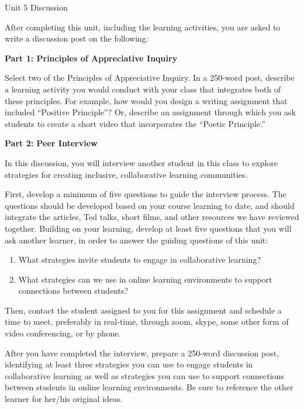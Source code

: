\documentclass[
]{book}
\providecommand{\tightlist}{%
  \setlength{\itemsep}{0pt}\setlength{\parskip}{0pt}}
\begin{document}
\begin{assessment}
{Unit 5 Discussion}

After completing this unit, including the learning activities, you are asked to write a discussion post on the following:

\textbf{Part 1: Principles of Appreciative Inquiry}

Select two of the Principles of Appreciative Inquiry. In a 250-word post, describe a learning activity you would conduct with your class that integrates both of these principles. For example, how would you design a writing assignment that included ``Positive Principle''? Or, describe an assignment through which you ask students to create a short video that incorporates the ``Poetic Principle.''

\textbf{Part 2: Peer Interview}

In this discussion, you will interview another student in this class to explore strategies for creating inclusive, collaborative learning communities.

First, develop a minimum of five questions to guide the interview process. The questions should be developed based on your course learning to date, and should integrate the articles, Ted talks, short films, and other resources we have reviewed together. Building on your learning, develop at least five questions that you will ask another learner, in order to answer the guiding questions of this unit:

\begin{enumerate}
\def\labelenumi{\arabic{enumi}.}
\tightlist
\item
  What strategies invite students to engage in collaborative learning?\\
\item
  What strategies can we use in online learning environments to support connections between students?
\end{enumerate}

Then, contact the student assigned to you for this assignment and schedule a time to meet, preferably in real-time, through zoom, skype, some other form of video conferencing, or by phone.

After you have completed the interview, prepare a 250-word discussion post, identifying at least three strategies you can use to engage students in collaborative learning as well as strategies you can use to support connections between students in online learning environments. Be sure to reference the other learner for her/his original ideas.
\end{assessment}
\end{document}
